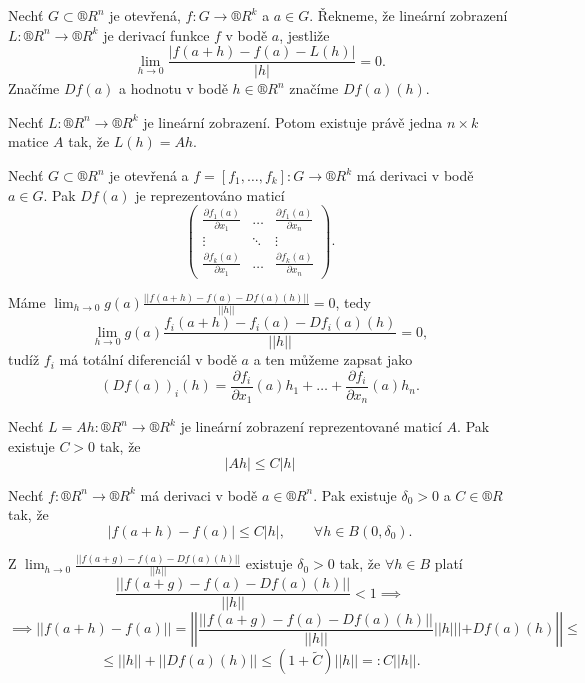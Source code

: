 \documentclass[12pt]{article}					%
\begin{document}
	\begin{definice}
		Nechť $G \subset ®R^n$ je otevřená, $f: G \rightarrow ®R^k$ a $a \in G$. Řekneme, že lineární zobrazení $L: ®R^n \rightarrow ®R^k$ je derivací funkce $f$ v bodě $a$, jestliže
		$$ \lim_{h \rightarrow 0} \frac{|f(a + h) - f(a) - L(h)|}{|h|} = 0. $$
		Značíme $D f(a)$ a hodnotu v bodě $h \in ®R^n$ značíme $D f(a)(h)$.
	\end{definice}

	\begin{poznamka}
		Nechť $L: ®R^n \rightarrow ®R^k$ je lineární zobrazení. Potom existuje právě jedna $n \times k$ matice $A$ tak, že $L(h) = A h$.
	\end{poznamka}


	\begin{veta}
		Nechť $G \subset ®R^n$ je otevřená a $f = [f_1, …, f_k]: G \rightarrow ®R^k$ má derivaci v bodě $a \in G$. Pak $D f(a)$ je reprezentováno maticí
		$$ \begin{pmatrix} \frac{\partial f_1(a)}{\partial x_1} & … & \frac{\partial f_1(a)}{\partial x_n} \\ \vdots & \ddots & \vdots \\ \frac{\partial f_k(a)}{\partial x_1} & … & \frac{\partial f_k(a)}{\partial x_n} \end{pmatrix}. $$

		\begin{dukazin}
			Máme $\lim_{h → 0} g(a) \frac{||f(a + h) - f(a) - D f(a)(h)||}{||h||} = 0$, tedy
			$$ \lim_{h → 0} g(a) \frac{f_i(a + h) - f_i(a) - D f_i(a)(h)}{||h||} = 0, $$
			tudíž $f_i$ má totální diferenciál v bodě $a$ a ten můžeme zapsat jako
			$$ (D f(a))_i(h) = \frac{\partial f_i}{\partial x_1}(a) h_1 + … + \frac{\partial f_i}{\partial x_n}(a)h_n. $$
		\end{dukazin}
	\end{veta}

	\begin{poznamka}
		Nechť $L = A h: ®R^n \rightarrow ®R^k$ je lineární zobrazení reprezentované maticí $A$. Pak existuje $C > 0$ tak, že
		$$ |A h| ≤ C |h| $$
	\end{poznamka}

	\begin{lemma}
		Nechť $f: ®R^n \rightarrow ®R^k$ má derivaci v bodě $a \in ®R^n$. Pak existuje $\delta_0 > 0$ a $C \in ®R$ tak, že
		$$ |f(a + h) - f(a)| ≤ C|h|, \qquad \forall h \in B(0, \delta_0). $$

		\begin{dukazin}
			Z $\lim_{h \rightarrow 0} \frac{||f(a + g) - f(a) - D f(a)(h)||}{||h||}$ existuje $\delta_0 > 0$ tak, že $\forall h \in B$ platí
			$$ \frac{||f(a + g) - f(a) - D f(a)(h)||}{||h||} < 1 \implies $$
			$$ \implies ||f(a + h) - f(a)|| = \left|\left| \frac{||f(a + g) - f(a) - D f(a)(h)||}{||h||}||h||| + D f(a)(h)\right|\right| ≤ $$
			$$ ≤ ||h|| + ||D f(a)(h)|| ≤ (1 + \tilde C)||h|| =: C ||h||. $$
		\end{dukazin}
	\end{lemma}
\end{document}
